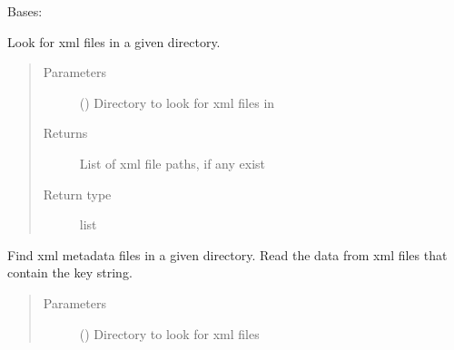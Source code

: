 \documentclass[letterpaper,10pt,english]{sphinxmanual}
\begin{document}

\begin{fulllineitems}
\label{\detokenize{polo.utils:polo.utils.io_utils.XmlReader}}
Bases: 

\begin{fulllineitems}
\label{\detokenize{polo.utils:polo.utils.io_utils.XmlReader.discover_xml_files}}
Look for xml files in a given directory.
\begin{quote}\begin{description}
\item[{Parameters}] \leavevmode
{} () \textendash{} Directory to look for xml files in

\item[{Returns}] \leavevmode
List of xml file paths, if any exist

\item[{Return type}] \leavevmode
list

\end{description}\end{quote}

\end{fulllineitems}


\begin{fulllineitems}
\label{\detokenize{polo.utils:polo.utils.io_utils.XmlReader.find_and_read_plate_data}}
Find xml metadata files in a given directory. Read the
data from xml files that contain the  key
string.
\begin{quote}\begin{description}
\item[{Parameters}] \leavevmode
{} () \textendash{} Directory to look for xml files


\end{description}
\end{quote}
\end{fulllineitems}
\end{fulllineitems}
\end{document}
